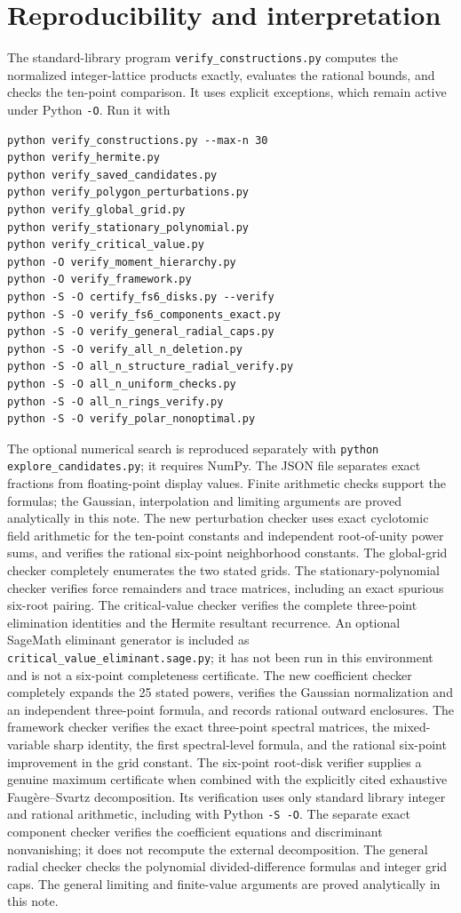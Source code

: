 \documentclass[11pt]{article}
\theoremstyle{remark}
\numberwithin{equation}{section}
\begin{document}
\section{Reproducibility and interpretation}
The standard-library program \texttt{verify\_constructions.py} computes
the normalized integer-lattice products exactly, evaluates the
rational bounds, and checks the ten-point comparison.
It uses explicit exceptions, which remain active under Python
\texttt{-O}. Run it with
\begin{verbatim}
python verify_constructions.py --max-n 30
python verify_hermite.py
python verify_saved_candidates.py
python verify_polygon_perturbations.py
python verify_global_grid.py
python verify_stationary_polynomial.py
python verify_critical_value.py
python -O verify_moment_hierarchy.py
python -O verify_framework.py
python -S -O certify_fs6_disks.py --verify
python -S -O verify_fs6_components_exact.py
python -S -O verify_general_radial_caps.py
python -S -O verify_all_n_deletion.py
python -S -O all_n_structure_radial_verify.py
python -S -O all_n_uniform_checks.py
python -S -O all_n_rings_verify.py
python -S -O verify_polar_nonoptimal.py
\end{verbatim}
The optional numerical search is reproduced separately with
\texttt{python explore\_candidates.py}; it requires NumPy.
The JSON file separates exact fractions from floating-point display
values. Finite arithmetic checks support the formulas; the Gaussian,
interpolation and limiting arguments are proved analytically in this note.
The new perturbation checker uses exact cyclotomic field arithmetic
for the ten-point constants and independent root-of-unity power sums,
and verifies the rational six-point neighborhood constants.
The global-grid checker completely enumerates the two stated grids.
The stationary-polynomial checker verifies force remainders and trace
matrices, including an exact spurious six-root pairing. The critical-value
checker verifies the complete three-point elimination identities and
the Hermite resultant recurrence. An optional SageMath eliminant
generator is included as \texttt{critical\_value\_eliminant.sage.py};
it has not been run in this environment and is not a six-point
completeness certificate.
The new coefficient checker completely expands the 25 stated powers,
verifies the Gaussian normalization and an independent three-point
formula, and records rational outward enclosures. The framework checker
verifies the exact three-point spectral matrices, the mixed-variable
sharp identity, the first spectral-level formula, and the rational
six-point improvement in the grid constant. The six-point root-disk verifier supplies a genuine maximum
certificate when combined with the explicitly cited exhaustive
Faug\`ere--Svartz decomposition. Its verification uses only standard
library integer and rational arithmetic, including with Python
\texttt{-S -O}. The separate exact component checker verifies the
coefficient equations and discriminant nonvanishing; it does not
recompute the external decomposition. The general radial checker
checks the polynomial divided-difference formulas and integer grid
caps. The general limiting and finite-value arguments are proved
analytically in this note.
\end{document}
